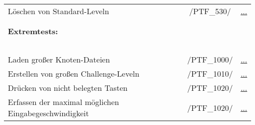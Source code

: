 \begin{longtable}{p{0.5\hsize}p{0.275\hsize}p{0.275\hsize}}
	\\
	
	  \multicolumn{1}{L{6.5cm}}{Löschen von Standard-Leveln}
	& \multicolumn{1}{c}{/PTF\_530/}
	& \multicolumn{1}{c}{\hyperref[]{...}}
	
	\\
	\\
	\\
	
	
	

	  \multicolumn{3}{l}{\textbf{Extremtests:}}
	  
	\\
	
	  \multicolumn{3}{l}{~}
	  
	\\
	
	  \multicolumn{1}{L{6.5cm}}{Laden großer Knoten-Dateien}
	& \multicolumn{1}{c}{/PTF\_1000/}
	& \multicolumn{1}{c}{\hyperref[]{...}}
	
	\\
	
	  \multicolumn{1}{L{6.5cm}}{Erstellen von großen Challenge-Leveln}
	& \multicolumn{1}{c}{/PTF\_1010/}
	& \multicolumn{1}{c}{\hyperref[]{...}}
	
	\\
	
	  \multicolumn{1}{L{6.5cm}}{Drücken von nicht belegten Tasten}
	& \multicolumn{1}{c}{/PTF\_1020/}
	& \multicolumn{1}{c}{\hyperref[]{...}}
	
	\\
	
	  \multicolumn{1}{L{6.5cm}}{Erfassen der maximal möglichen Eingabegeschwindigkeit}
	& \multicolumn{1}{c}{/PTF\_1020/}
	& \multicolumn{1}{c}{\hyperref[]{...}}
	
	\\
	
\end{longtable}


